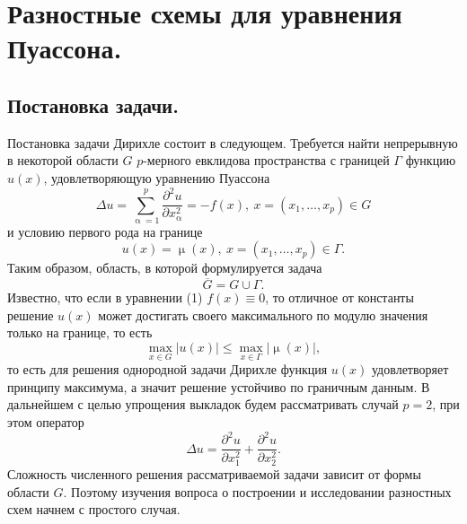 \documentclass[a4paper, 12pt]{report}
\numberwithin{equation}{section}
\newcommand{\ol}{\overline}
\renewcommand{\leq}{\leqslant}
\renewcommand{\alpha}{\upalpha}
\renewcommand{\mu}{\upmu}
\renewcommand{\d}{\partial}
\begin{document}
	\section{Разностные схемы для уравнения Пуассона.}
	\subsection{Постановка задачи.}
	Постановка задачи Дирихле состоит в следующем. Требуется найти непрерывную в некоторой области $G$ $p$-мерного евклидова пространства с границей $\Gamma$ функцию $u(x)$, удовлетворяющую уравнению Пуассона
	\begin{equation}
		\Delta u = \sum_{\alpha = 1}^{p}\dfrac{\d ^2 u}{\d x_\alpha^2} = -f(x),\ x = (x_1,\ldots, x_p)\in G
	\end{equation}
	и условию первого рода на границе
	\begin{equation}
		u(x) = \mu(x),\ x = (x_1,\ldots, x_p) \in \Gamma.
	\end{equation}
	Таким образом, область, в которой формулируется задача
	$$\ol G = G \cup \Gamma.$$
	Известно, что если в уравнении (1) $f(x) \equiv 0$, то отличное от константы решение $u(x)$ может достигать своего максимального по модулю значения только на границе, то есть
	$$\underset{x \in G}{\max}|u(x)|\leq \underset{x \in \Gamma}{\max}|\mu(x)|,$$
	то есть для решения однородной задачи Дирихле функция $u(x)$ удовлетворяет принципу максимума, а значит решение устойчиво по граничным данным.
	В дальнейшем с целью упрощения выкладок будем рассматривать случай $p=2$, при этом оператор 
	\begin{equation}
		\Delta u  = \dfrac{\d ^2 u}{\d x_1^2} + \dfrac{\d ^2 u}{\d x_2^2}.
	\end{equation}
	Сложность численного решения рассматриваемой задачи зависит от формы области $G$. Поэтому изучения вопроса о построении и исследовании разностных схем начнем с простого случая.
\end{document}
